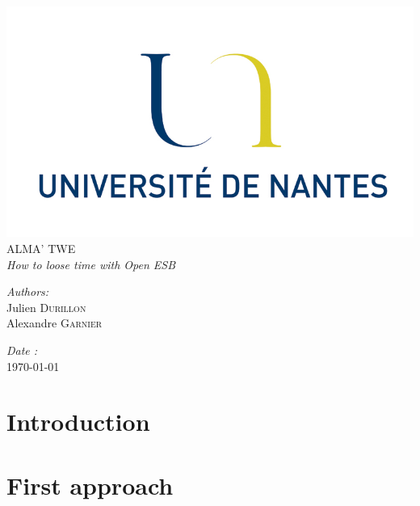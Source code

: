 \documentclass[a4paper]{article}
\begin{document}
	\begin{titlepage}
		\begin{center}
		\includegraphics{logo_fac.png}\\[3.0cm]
		{\Huge ALMA' TWE}\\[0.5cm]
		{\huge\itshape How to loose time with Open ESB}\\[3.0cm]
		\end{center}
		
		\begin{minipage}{0.4\textwidth}
		\begin{flushleft}
			\emph{Authors:}\\[0.1cm]
			Julien \textsc{Durillon}\\
			Alexandre \textsc{Garnier}
		\end{flushleft}
		\end{minipage}
		\begin{minipage}{0.4\textwidth}
		\begin{flushright}
			\emph{Date :}\\[0.1cm]
			\today
		\end{flushright}
		\end{minipage}
		
	\end{titlepage}

	\tableofcontents\clearpage

	\section*{Introduction}

	\section{First approach}
	
\end{document}
